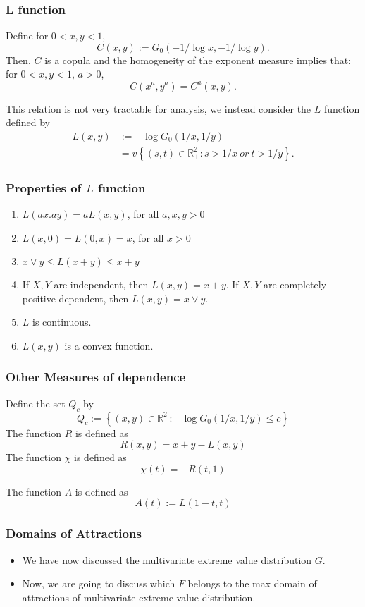 \documentclass{beamer}
\newcommand{\set}[1]{\left\{#1\right\}}
\begin{document}
\begin{frame}
    \frametitle{L function}
Define for $0<x,y<1$, 
$$
C(x,y):=G_0(-1/\log x, -1/\log y).
$$
Then, $C$ is a copula and the homogeneity of the exponent measure implies that: for $0<x,y<1$, $a>0$,
$$
C(x^a,y^a)=C^a(x,y).
$$

This relation is not very tractable for analysis, we instead consider the $L$ function defined by 
$$
\begin{aligned}
    L(x,y)&:=-\log G_0(1/x,1/y)\\
    &=v\set{(s,t)\in \mathbb{R}_{+}^2:s>1/x \ or \ t>1/y}.
\end{aligned}
$$
\end{frame}


\begin{frame}
    \frametitle{Properties of $L$ function}

\begin{enumerate}
    \item $L(ax.ay)=aL(x,y)$, for all $a,x,y>0$
    \item $L(x,0)=L(0,x)=x$, for all $x>0$
    \item $x\lor y \le L(x+y)\le x+y$
    \item If $X,Y$ are independent, then $L(x,y)=x+y$. If $X,Y$ are completely positive dependent, then $L(x,y)=x\lor y$.
    \item $L$ is continuous.
    \item $L(x,y)$ is a convex function.
\end{enumerate}
 


\end{frame}


\begin{frame}
    \frametitle{Other Measures of dependence}
Define the set $Q_c$ by 
$$
Q_c:=\set{(x,y)\in\mathbb{R}_{+}^2:-\log G_0(1/x,1/y)\le c}
$$
The function $R$ is defined as 
$$
R(x,y)=x+y-L(x,y)
$$
The function $\chi$ is defined as 
$$
\chi(t)=-R(t,1)
$$

The function $A$ is defined as 
$$
A(t):=L(1-t,t)
$$

\end{frame}



\begin{frame}
    \frametitle{Domains of Attractions}
\begin{itemize}
    \item We have now discussed the multivariate extreme value distribution $G$.
    \bigskip
    \item Now, we are going to discuss which $F$ belongs to the max domain of attractions of multivariate extreme value distribution.
\end{itemize}
\end{frame}
\end{document}
